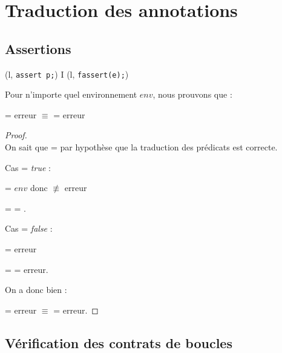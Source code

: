 \section{Traduction des annotations}
\label{sec:annotation-translation}


\subsection{Assertions}


{\scriptsize
  {
    {(l, \mbox{\lstinline'assert p;'})
       I \concat (l, \mbox{\lstinline'fassert(e);'})}
  }
}


Pour n'importe quel environnement $env$, nous prouvons que :

 = erreur
$\equiv$  = erreur


\begin{proof}
  ~\\
  On sait que  =  par hypothèse que
  la traduction des prédicats est correcte.

  Cas  = \textit{true} :

   = $env$
  donc  $\not \equiv$ erreur

  = 
  = .


  Cas  = \textit{false} :

   = erreur

  = 
  = erreur.

  On a donc bien :

   = erreur
  $\equiv$  = erreur.
\end{proof}


\subsection{Vérification des contrats de boucles}


